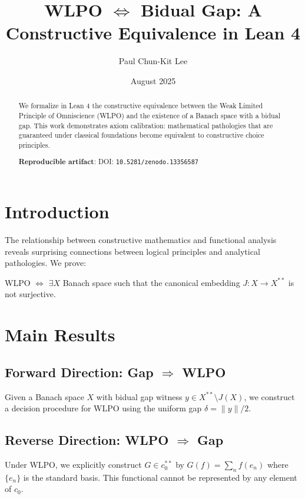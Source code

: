 \documentclass{article}
\title{WLPO $\Leftrightarrow$ Bidual Gap: A Constructive Equivalence in Lean 4}
\author{Paul Chun-Kit Lee}
\date{August 2025}
\begin{document}
\maketitle

\begin{abstract}
We formalize in Lean 4 the constructive equivalence between the Weak Limited Principle of Omniscience (WLPO) and the existence of a Banach space with a bidual gap. This work demonstrates axiom calibration: mathematical pathologies that are guaranteed under classical foundations become equivalent to constructive choice principles.

\textbf{Reproducible artifact}: DOI: \texttt{10.5281/zenodo.13356587}
\end{abstract}

\section{Introduction}

The relationship between constructive mathematics and functional analysis reveals surprising connections between logical principles and analytical pathologies. We prove:

\begin{theorem}
WLPO $\Leftrightarrow$ $\exists X$ Banach space such that the canonical embedding $J: X \to X^{**}$ is not surjective.
\end{theorem}

\section{Main Results}

\subsection{Forward Direction: Gap $\Rightarrow$ WLPO}

Given a Banach space $X$ with bidual gap witness $y \in X^{**} \setminus J(X)$, we construct a decision procedure for WLPO using the uniform gap $\delta = \|y\|/2$.

\subsection{Reverse Direction: WLPO $\Rightarrow$ Gap}

Under WLPO, we explicitly construct $G \in c_0^{**}$ by $G(f) = \sum_n f(e_n)$ where $\{e_n\}$ is the standard basis. This functional cannot be represented by any element of $c_0$.
\end{document}
